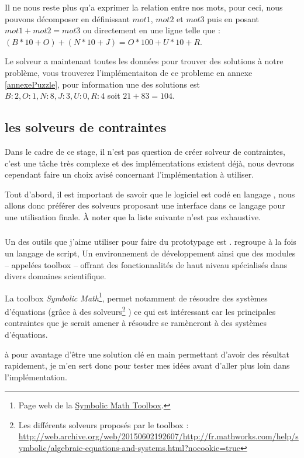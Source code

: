 Il ne nous reste plus qu'a exprimer la relation entre nos mots, pour ceci, nous pouvons décomposer en définissant $mot1$, $mot2$ et $mot3$ puis en posant $mot1+mot2=mot3$ ou directement en une ligne telle que : $(B*10 + O) +(N*10 +J) = O*100+U*10+R$.

Le solveur a maintenant toutes les données pour trouver des solutions à notre problème, vous trouverez l'implémentaiton de ce probleme en annexe \ref{annexePuzzle}, pour information une des solutions est ${B:2,O:1,N:8,J:3,U:0,R:4}$ soit $21+83=104$.




\subsection{les solveurs de contraintes}
Dans le cadre de ce stage, il n'est pas question de créer solveur de contraintes, c'est une tâche très complexe et des implémentations existent déjà, nous devrons cependant faire un choix avisé concernant l'implémentation à utiliser.

Tout d'abord, il est important de savoir que le logiciel \iscore{} est codé en langage \cpp{}, nous allons donc préférer des solveurs proposant une interface dans ce langage pour une utilisation finale. À noter que la liste suivante n'est pas exhaustive.%

\subsubsection{\matlab{}}
Un des outils que j'aime utiliser pour faire du prototypage est \matlab{}. \matlab{} regroupe à la fois un langage de script, Un environnement de développement ainsi que des modules -- appelées toolbox -- offrant des fonctionnalités de haut niveau spécialisés dans divers domaines scientifique.

La toolbox \emph{Symbolic Math}\footnote{Page web de la \href{http://fr.mathworks.com/products/symbolic/}{Symbolic Math Toolbox}.}, permet notamment de résoudre des systèmes d'équations (grâce à des solveurs\footnote{Les différents solveurs proposés par le toolbox : \url{http://web.archive.org/web/20150602192607/http://fr.mathworks.com/help/symbolic/algebraic-equations-and-systems.html?nocookie=true}} \archive{}) ce qui est intéressant car les principales contraintes que je serait amener à résoudre se ramèneront à des systèmes d'équations.

\matlab{} à pour avantage d'être une solution clé en main permettant d'avoir des résultat rapidement, je m'en sert donc pour tester mes idées avant d'aller plus loin dans l'implémentation.

